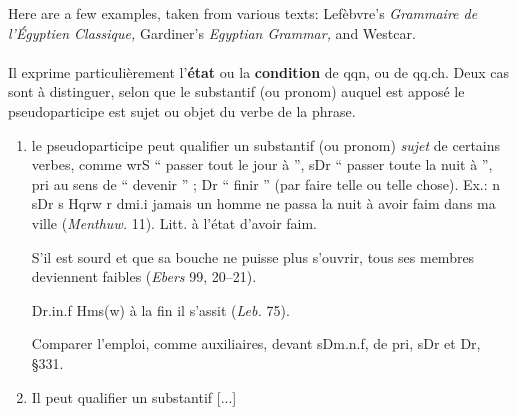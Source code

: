 \documentclass[final]{article}
\def\htimage#1{{#1\relax}}
\begin{document}
Here are a few examples, taken from various texts: Lef\`ebvre's {\it
  Grammaire de l'\'Egyptien Classique,\/} Gardiner's {\it Egyptian
  Grammar,\/} and Westcar.
\vspace{2em}


 \paragraph{} 
 Il exprime particuli\`erement l'{\bf \'etat} ou la {\bf condition} de qqn,
 ou de qq.ch. Deux cas sont \`a distinguer, selon que le substantif (ou
 pronom) auquel est appos\'e le pseudoparticipe est sujet ou objet du
 verbe de la phrase.

 \begin{enumerate}
 \item le pseudoparticipe peut qualifier un substantif (ou pronom) {\em
     sujet\/} de certains verbes, comme 
   \htimage{\eg wrS\/} `` passer tout le jour \`a '', 
 \htimage{\eg sDr\/} `` passer toute la nuit \`a '',  
 \htimage{\eg pri\/} au sens de `` devenir '' ;
 \htimage{\eg Dr\/} `` finir '' (par faire telle ou telle chose).
   Ex.: 
 \htimage{\eg n sDr s Hqrw r dmi.i\/} jamais un homme ne passa la nuit \`a
   avoir faim dans ma ville ({\it Menthuw.\/} 11). Litt. \`a l'\'etat
   d'avoir faim.

   S'il est sourd et que sa bouche ne puisse plus s'ouvrir, 
   tous ses membres deviennent faibles ({\it Ebers\/} 99, 20--21).

 \htimage{\eg Dr.in.f Hms(w)\/} \`a la fin il s'assit ({\it Leb.\/} 75).

   Comparer l'emploi, comme auxiliaires, devant \htimage{\eg sDm.n.f,\/} de \htimage{\eg
     pri, sDr\/} et \htimage{\eg Dr,} \S 331.

 \item Il peut qualifier un substantif [...]
 \end{enumerate}
\end{document}
